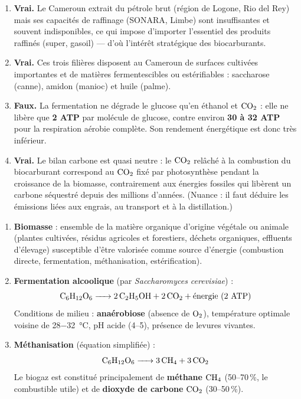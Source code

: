 \documentclass[11pt]{article}
\begin{document}
\begin{corrige}
\begin{enumerate}
\item \textbf{Vrai.} Le Cameroun extrait du pétrole brut (région de Logone, Rio del Rey) mais ses capacités de raffinage (SONARA, Limbe) sont insuffisantes et souvent indisponibles, ce qui impose d'importer l'essentiel des produits raffinés (super, gasoil) — d'où l'intérêt stratégique des biocarburants.
\item \textbf{Vrai.} Ces trois filières disposent au Cameroun de surfaces cultivées importantes et de matières fermentescibles ou estérifiables : saccharose (canne), amidon (manioc) et huile (palme).
\item \textbf{Faux.} La fermentation ne dégrade le glucose qu'en éthanol et $\ce{CO2}$ : elle ne libère que \textbf{2 ATP} par molécule de glucose, contre environ \textbf{30 à 32 ATP} pour la respiration aérobie complète. Son rendement énergétique est donc très inférieur.
\item \textbf{Vrai.} Le bilan carbone est quasi neutre : le $\ce{CO2}$ relâché à la combustion du biocarburant correspond au $\ce{CO2}$ fixé par photosynthèse pendant la croissance de la biomasse, contrairement aux énergies fossiles qui libèrent un carbone séquestré depuis des millions d'années. (Nuance : il faut déduire les émissions liées aux engrais, au transport et à la distillation.)
\end{enumerate}
\end{corrige}

\begin{corrige}
\begin{enumerate}
\item \textbf{Biomasse} : ensemble de la matière organique d'origine végétale ou animale (plantes cultivées, résidus agricoles et forestiers, déchets organiques, effluents d'élevage) susceptible d'être valorisée comme source d'énergie (combustion directe, fermentation, méthanisation, estérification).
\item \textbf{Fermentation alcoolique} (par \emph{Saccharomyces cerevisiae}) :
\[ \ce{C6H12O6 -> 2 C2H5OH + 2 CO2} + \text{énergie (2 ATP)} \]
Conditions de milieu : \textbf{anaérobiose} (absence de $\ce{O2}$), température optimale voisine de \SI{28-32}{\degreeCelsius}, pH acide (4--5), présence de levures vivantes.
\item \textbf{Méthanisation} (équation simplifiée) :
\[ \ce{C6H12O6 -> 3 CH4 + 3 CO2} \]
Le biogaz est constitué principalement de \textbf{méthane} $\ce{CH4}$ (50--70\,\%, le combustible utile) et de \textbf{dioxyde de carbone} $\ce{CO2}$ (30--50\,\%).
\end{enumerate}
\end{corrige}
\end{document}
